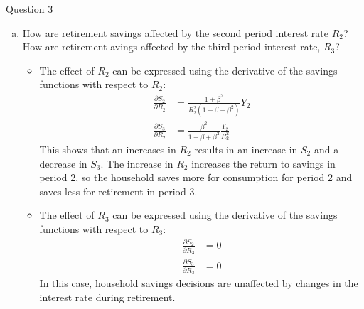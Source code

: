 \documentclass[a4paper]{article}
\newif\IfInSansMode
\begin{document}
\begin{questionbox}{Question 3}
\begin{enumerate}[(a)]
\begin{explanationbox}
\begin{itemize}
				\end{itemize}
			\end{explanationbox}
			\item How are retirement savings affected by the second period interest rate \( R_2 \)? How are retirement avings affected by the third period interest rate, \( R_3 \)?
			\begin{explanationbox}
				\begin{itemize}
					\item The effect of \( R_2 \) can be expressed using the derivative of the savings functions with respect to \( R_2 \):
					\begin{align*}
						\frac{\partial S_2}{\partial R_2} &= \frac{1 + \beta^2}{R_2^2 (1 + \beta + \beta^2)}Y_2\\
						\frac{\partial S_3}{\partial R_2} &= \frac{\beta^2}{1 + \beta + \beta^2}\frac{Y_2}{R_2^2}
					\end{align*}
					This shows that an increases in \( R_2 \) results in an increase in \( S_2 \) and a decrease in \( S_3 \). The increase in \( R_2 \) increases the return to savings in period 2, so the household saves more for consumption for period 2 and saves less for retirement in period 3.
				\end{itemize}
			\end{explanationbox}
			\begin{explanationbox}
				\begin{itemize}
					\item The effect of \( R_3 \) can be expressed using the derivative of the savings functions with respect to \( R_3 \):
					\begin{align*}
						\frac{\partial S_2}{\partial R_3} &= 0\\
						\frac{\partial S_3}{\partial R_3} &= 0
					\end{align*}
					In this case, household savings decisions are unaffected by changes in the interest rate during retirement.
				\end{itemize}
			\end{explanationbox}
		\end{enumerate}
	\end{questionbox}
\end{document}
